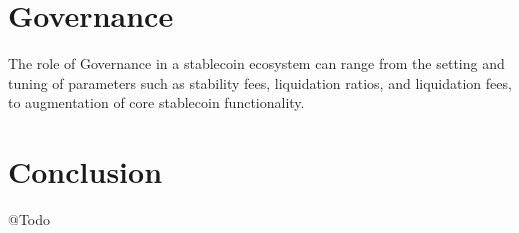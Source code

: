 \documentclass[12pt]{article}
\begin{document}
\section{Governance}

The role of Governance in a stablecoin ecosystem can range from the setting and tuning of parameters such as stability fees, liquidation ratios, and liquidation fees, to augmentation of core stablecoin functionality.

\section{Conclusion}
\begin{flushleft}
	\color{red} @Todo
\end{flushleft}
\end{document}

